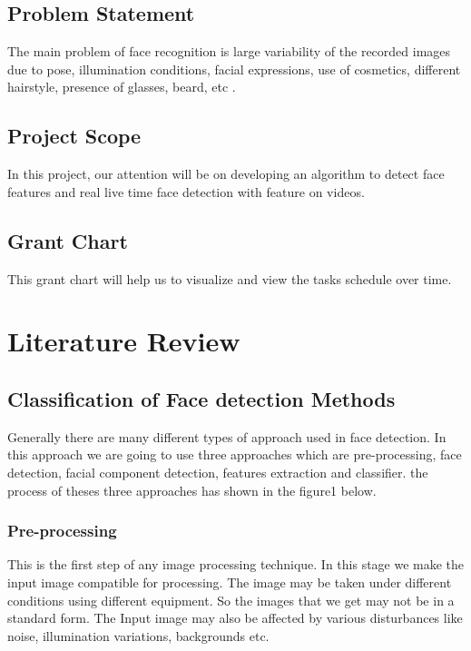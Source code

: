 \documentclass[12pt]{report}
\begin{document}
 
\section{Problem Statement} 
                
The main problem of face recognition is large variability of the recorded images due to pose, illumination conditions, facial expressions, use of cosmetics, different hairstyle, presence of glasses, beard, etc \cite{bibid}.

 
\section{Project Scope}     
            
In this project, our attention will be on developing an algorithm to detect face features and real live time face detection with feature on videos. 

\section{Grant Chart}     

This grant chart will help us to visualize and view the tasks schedule over time.

\chapter{Literature Review}               
                
\section{Classification of Face detection Methods}                 
Generally there are many different types of approach used in face detection. In this approach we are going to use three approaches which are pre-processing, face detection, facial component detection, features extraction and classifier. the process of theses three approaches has shown in the figure1 below. 
\subsection{Pre-processing}

This is the first step of any image processing technique. In this stage we make the input image compatible for processing. The image may be taken under different conditions using different equipment. So the images that we get may not be in a standard form. The Input image may also be affected by various disturbances like noise, illumination variations, backgrounds etc.
\end{document}
